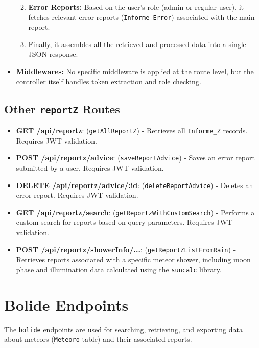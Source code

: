 \documentclass{article}
\begin{document}
\begin{itemize}
\begin{enumerate}
\begin{itemize}
        \end{itemize}
        \item \textbf{Error Reports:} Based on the user's role (admin or regular user), it fetches relevant error reports (\texttt{Informe\_Error}) associated with the main report.
        \item Finally, it assembles all the retrieved and processed data into a single JSON response.
    \end{enumerate}
    \item \textbf{Middlewares:} No specific middleware is applied at the route level, but the controller itself handles token extraction and role checking.
\end{itemize}

\subsection{Other \texttt{reportZ} Routes}
\begin{itemize}
    \item \textbf{GET /api/reportz}: (\texttt{getAllReportZ}) - Retrieves all \texttt{Informe\_Z} records. Requires JWT validation.
    \item \textbf{POST /api/reportz/advice}: (\texttt{saveReportAdvice}) - Saves an error report submitted by a user. Requires JWT validation.
    \item \textbf{DELETE /api/reportz/advice/:id}: (\texttt{deleteReportAdvice}) - Deletes an error report. Requires JWT validation.
    \item \textbf{GET /api/reportz/search}: (\texttt{getReportzWithCustomSearch}) - Performs a custom search for reports based on query parameters. Requires JWT validation.
    \item \textbf{POST /api/reportz/showerInfo/...}: (\texttt{getReportZListFromRain}) - Retrieves reports associated with a specific meteor shower, including moon phase and illumination data calculated using the \texttt{suncalc} library.
\end{itemize}

\section{Bolide Endpoints}
The \texttt{bolide} endpoints are used for searching, retrieving, and exporting data about meteors (\texttt{Meteoro} table) and their associated reports.
\end{document}
